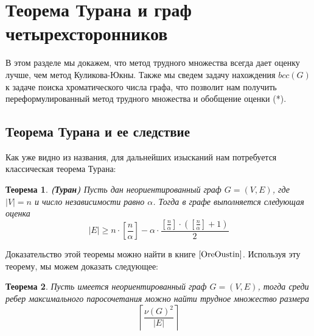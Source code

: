 \documentclass[a4paper]{article}
\newtheorem{mtheorem}{Теорема}[section]
\begin{document}
\setcounter{mclaim}{0}
\setcounter{mlemma}{0}
\setcounter{mtheorem}{0}
\addtocounter{section}{1}
\section*{Теорема Турана и граф четырехсторонников}
В этом разделе мы докажем, что метод трудного множества всегда дает оценку лучше, чем метод Куликова-Юкны. 
Также мы сведем задачу нахождения $bcc(G)$ к задаче поиска хроматического числа графа, 
что позволит нам получить переформулированный метод трудного множества и обобщение оценки (*).  

\setcounter{subsection}{0}
\subsection{Теорема Турана и ее следствие}
Как уже видно из названия, для дальнейших изысканий нам потребуется классическая теорема Турана:
\begin{mtheorem}\emph{\textbf{(Туран)}}
    Пусть дан неориентированный граф $G = (V, E)$, где $|V| = n$ и число независимости равно $\alpha$. 
    Тогда в графе выполняется следующая оценка $$|E| \geq n\cdot\left[\frac{n}{\alpha}\right] - 
    \alpha\cdot\frac{\left[\frac{n}{\alpha}\right]\cdot\left(\left[\frac{n}{\alpha}\right] + 1\right)}{2}$$
\end{mtheorem}

Доказательство этой теоремы можно найти в книге $\cite{OreOustin}$. Используя эту теорему, мы можем доказать следующее:
\begin{mtheorem}
    Пусть имеется неориентированный граф $G = (V, E)$, тогда среди ребер максимального паросочетания можно 
    найти трудное множество размера $$\left\lceil\frac{\nu(G)^2}{|E|}\right\rceil$$
\end{mtheorem}
\end{document}

